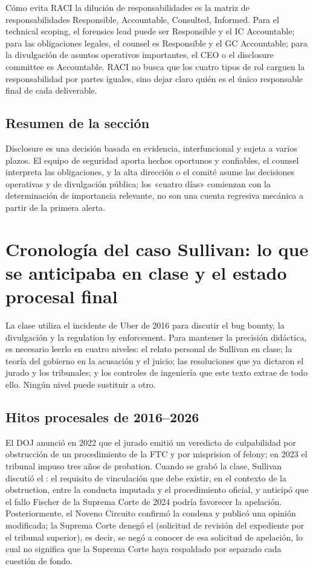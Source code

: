 \documentclass[a4paper]{article}
\begin{document}
\begin{knowledgebox}{Cómo evita RACI la dilución de responsabilidades}
 es la matriz de responsabilidades Responsible, Accountable, Consulted, Informed. Para el technical scoping, el forensics lead puede ser Responsible y el IC Accountable; para las obligaciones legales, el counsel es Responsible y el GC Accountable; para la divulgación de asuntos operativos importantes, el CEO o el disclosure committee es Accountable. RACI no busca que los cuatro tipos de rol carguen la responsabilidad por partes iguales, sino dejar claro quién es el único responsable final de cada deliverable.
\end{knowledgebox}

\subsection{Resumen de la sección}

Disclosure es una decisión basada en evidencia, interfuncional y sujeta a varios plazos. El equipo de seguridad aporta hechos oportunos y confiables, el counsel interpreta las obligaciones, y la alta dirección o el comité asume las decisiones operativas y de divulgación pública; los «cuatro días» comienzan con la determinación de importancia relevante, no son una cuenta regresiva mecánica a partir de la primera alerta.
\section{Cronología del caso Sullivan: lo que se anticipaba en clase y el estado procesal final}

La clase utiliza el incidente de Uber de 2016 para discutir el bug bounty, la divulgación y la regulation by enforcement. Para mantener la precisión didáctica, es necesario leerlo en cuatro niveles: el relato personal de Sullivan en clase; la teoría del gobierno en la acusación y el juicio; las resoluciones que ya dictaron el jurado y los tribunales; y los controles de ingeniería que este texto extrae de todo ello. Ningún nivel puede sustituir a otro.

\subsection{Hitos procesales de 2016--2026}

El DOJ anunció en 2022 que el jurado emitió un veredicto de culpabilidad por obstrucción de un procedimiento de la FTC y por misprision of felony; en 2023 el tribunal impuso tres años de probation. Cuando se grabó la clase, Sullivan discutió el : el requisito de vinculación que debe existir, en el contexto de la obstruction, entre la conducta imputada y el procedimiento oficial, y anticipó que el fallo Fischer de la Suprema Corte de 2024 podría favorecer la apelación. Posteriormente, el Noveno Circuito confirmó la condena y publicó una opinión modificada; la Suprema Corte denegó el  (solicitud de revisión del expediente por el tribunal superior), es decir, se negó a conocer de esa solicitud de apelación, lo cual no significa que la Suprema Corte haya respaldado por separado cada cuestión de fondo.
\end{document}
